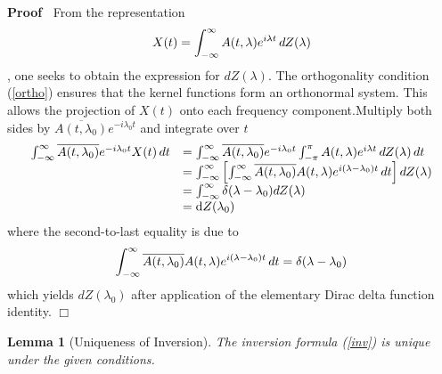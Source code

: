 \documentclass{article}
\newcommand{\mathd}{\mathrm{d}}
\newenvironment{proof}{\noindent\textbf{Proof\ }}{\hspace*{\fill}$\Box$\medskip}
\newtheorem{lemma}{Lemma}
\begin{document}
\begin{proof}
  From the representation
  \begin{equation}
    X (t) = \int_{- \infty}^{\infty} A (t, \lambda) e^{i \lambda t} 
    \hspace{0.17em} dZ (\lambda)
  \end{equation}
  , one seeks to obtain the expression for $dZ (\lambda)$. The orthogonality
  condition (\ref{ortho}) ensures that the kernel functions form an
  orthonormal system. This allows the projection of $X (t)$ onto each
  frequency component.Multiply both sides by $\overline{A (t, \lambda_0)} e^{-
  i \lambda_0 t}$ and integrate over $t$
  \begin{equation}
    \begin{array}{ll}
      \int_{- \infty}^{\infty} \overline{A (t, \lambda_0)} e^{- i \lambda_0 t}
      X (t)  \hspace{0.17em} dt & = \int_{- \infty}^{\infty} \overline{A (t,
      \lambda_0)} e^{- i \lambda_0 t}  \int_{- \pi}^{\pi} A (t, \lambda) e^{i
      \lambda t}  \hspace{0.17em} dZ (\lambda)  \hspace{0.17em} dt\\
      & = \int_{- \infty}^{\infty} \left[ \int_{- \infty}^{\infty}
      \overline{A (t, \lambda_0)} A (t, \lambda) e^{i (\lambda - \lambda_0) t}
      \hspace{0.17em} dt \right] dZ (\lambda)\\
      & = \int_{- \infty}^{\infty} \delta (\lambda - \lambda_0) dZ
      (\lambda)\\
      & = \mathd Z (\lambda_0)
    \end{array} \label{inv}
  \end{equation}
  where the second-to-last equality is due to
  \begin{equation}
    \int_{- \infty}^{\infty} \overline{A (t, \lambda_0)} A (t, \lambda) e^{i
    (\lambda - \lambda_0) t}  \hspace{0.17em} dt = \delta (\lambda -
    \lambda_0)
  \end{equation}
  which yields $dZ (\lambda_0)$ after application of the elementary Dirac
  delta function identity.
\end{proof}

\begin{lemma}
  [Uniqueness of Inversion] The inversion formula (\ref{inv}) is unique under
  the given conditions.
\end{lemma}
\end{document}
